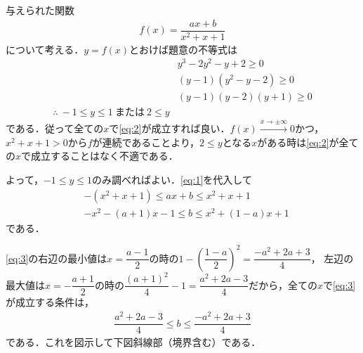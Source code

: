 \documentclass[../../main.tex]{subfiles}
\begin{document}
与えられた関数
\begin{align}
  f(x)=\dfrac{ax+b}{x^2+x+1} \label{eq:1}
\end{align}
について考える．$y=f(x)$とおけば題意の不等式は
\begin{align}
  & y^3-2y^2-y+2\ge0 \\
  & (y-1)(y^2-y-2)\ge0 \\
  & (y-1)(y-2)(y+1)\ge0 \\
  \therefore\
  -1\le y\le1\ \text{または}\ 2\le y \label{eq:2}
\end{align}
である．従って全ての$x$で\cref{eq:2}が成立すれば良い．$f(x)\xrightarrow{x\to\pm\infty}0$かつ，$x^2+x+1>0$から$f$が連続であることより，$2\le y$となる$x$がある時は\cref{eq:2}が全ての$x$で成立することはなく不適である．

よって，$-1\le y\le1$のみ調べればよい．\cref{eq:1}を代入して
\begin{align}
  & -(x^2+x+1)\le ax+b\le x^2+x+1 \\
  & -x^2-(a+1)x-1\le b\le x^2+(1-a)x+1 \label{eq:3}
\end{align}
である．

\cref{eq:3}の右辺の最小値は$x=\dfrac{a-1}{2}$の時の$1-\left(\dfrac{1-a}{2}\right)^2=\dfrac{-a^2+2a+3}{4}$，
左辺の最大値は$x=-\dfrac{a+1}{2}$の時の$\dfrac{(a+1)^2}{4}-1=\dfrac{a^2+2a-3}{4}$だから，全ての$x$で\cref{eq:3}が成立する条件は，
\begin{align}
  \dfrac{a^2+2a-3}{4}\le b\le\dfrac{-a^2+2a+3}{4} \label{eq:4}
\end{align}
である．これを図示して下図斜線部（境界含む）である．
\end{document}
